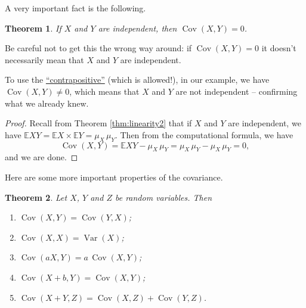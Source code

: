 \documentclass[
  a4paper,
]{book}
\providecommand{\tightlist}{%
  \setlength{\itemsep}{0pt}\setlength{\parskip}{0pt}}
\newtheorem{theorem}{Theorem}[chapter]
\theoremstyle{definition}
\theoremstyle{definition}
\theoremstyle{definition}
\theoremstyle{definition}
\theoremstyle{remark}
\begin{document}
A very important fact is the following.

\begin{theorem}
If \(X\) and \(Y\) are independent, then \(\operatorname{Cov}(X,Y) = 0\).
\end{theorem}

Be careful not to get this the wrong way around: if \(\operatorname{Cov}(X,Y) = 0\) it doesn't necessarily mean that \(X\) and \(Y\) are independent.

To use the \href{https://www.varsitytutors.com/hotmath/hotmath_help/topics/converse-inverse-contrapositive}{``contrapositive''} (which is allowed!), in our example, we have \(\operatorname{Cov}(X,Y) \neq 0\), which means that \(X\) and \(Y\) are not independent -- confirming what we already knew.

\begin{proof}
Recall from Theorem \ref{thm:linearity2} that if \(X\) and \(Y\) are independent, we have \(\mathbb EXY = \mathbb EX \times \mathbb EY = \mu_X \, \mu_Y\). Then from the computational formula, we have
\[ \operatorname{Cov}(X,Y) = \mathbb EXY - \mu_X\,\mu_Y = \mu_X\,\mu_Y - \mu_X\,\mu_Y = 0, \]
and we are done.
\end{proof}

Here are some more important properties of the covariance.

\begin{theorem}

Let \(X\), \(Y\) and \(Z\) be random variables. Then

\begin{enumerate}
\def\labelenumi{\arabic{enumi}.}
\tightlist
\item
  \(\operatorname{Cov}(X,Y) = \operatorname{Cov}(Y,X)\);
\item
  \(\operatorname{Cov}(X,X) = \operatorname{Var}(X)\);
\item
  \(\operatorname{Cov}(aX, Y) = a\,\operatorname{Cov}(X,Y)\);
\item
  \(\operatorname{Cov}(X + b, Y) = \operatorname{Cov}(X,Y)\);
\item
  \(\operatorname{Cov}(X + Y, Z) = \operatorname{Cov}(X, Z) + \operatorname{Cov}(Y,Z)\).
\end{enumerate}

\end{theorem}
\end{document}
